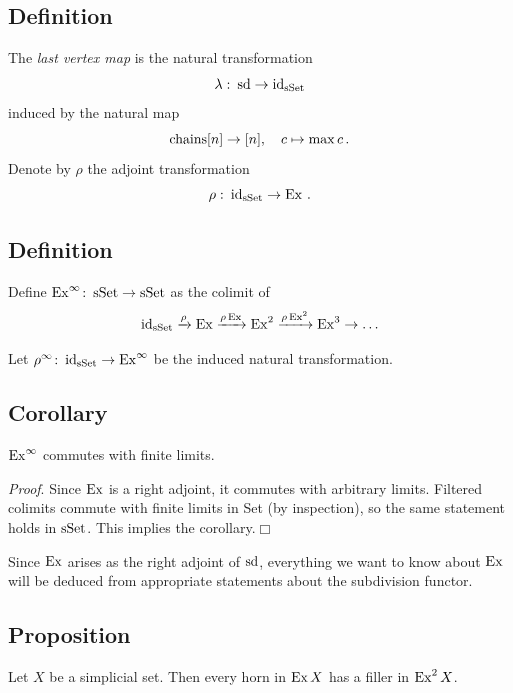     \subsection{Definition}\label{chV-4-9}
        The \emph{last vertex map} is the natural transformation
        \begin{equation*}
            \lambda \,\colon \operatorname{sd} \to \operatorname{id}_{\operatorname{sSet}}
        \end{equation*}
        induced by the natural map
        \begin{equation*}
            \operatorname{chains}[n] \to [n], \quad c \mapsto \max c \,.
        \end{equation*}
        Denote by $\rho$ the adjoint transformation
        \begin{equation*}
            \rho \,\colon \operatorname{id}_{\operatorname{sSet}} \to \operatorname{Ex} \,.
        \end{equation*}

    \subsection{Definition}\label{chV-4-10}
        Define $\operatorname{Ex}^{\infty} \colon \operatorname{sSet} \to \operatorname{sSet}$ as the colimit of
        \begin{equation*}
            \operatorname{id}_{\operatorname{sSet}} \xrightarrow{\rho} \operatorname{Ex} \xrightarrow{\rho \operatorname{Ex}} \operatorname{Ex}^2 \xrightarrow{\rho \operatorname{Ex}^2} \operatorname{Ex}^3 \rightarrow \ldots
        \end{equation*}

        Let $\rho^{\infty} \colon \operatorname{id}_{\operatorname{sSet}} \to \operatorname{Ex}^{\infty}$ be the induced natural transformation.

    \subsection{Corollary}\label{chV-4-11}
        $\operatorname{Ex}^{\infty}$ commutes with finite limits.
        \smallskip

        \emph{Proof}. Since $\operatorname{Ex}$ is a right adjoint, it commutes with arbitrary limits. Filtered colimits commute with finite limits in Set (by inspection), so the same statement holds in $\operatorname{sSet}$. This implies the corollary.\hfill$\Box$
        \medskip

        Since $\operatorname{Ex}$ arises as the right adjoint of $\operatorname{sd}$, everything we want to know about $\operatorname{Ex}$ will be deduced from appropriate statements about the subdivision functor.

    \subsection{Proposition}\label{chV-4-12}
        Let $X$ be a simplicial set. Then every horn in $\operatorname{Ex} X$ has a filler in $\operatorname{Ex}^2 X$.
        \smallskip

